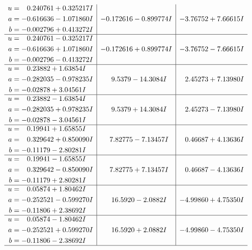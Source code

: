 \documentclass[1p]{elsarticle_modified}
\theoremstyle{definition}
\begin{document}
$$\begin{array}{c|c|c}
\begin{aligned}
u &= \phantom{-}0.240761 + 0.325217 I \\
a &= -0.616636 - 1.071860 I \\
b &= -0.002796 + 0.413272 I\end{aligned}
 & -0.172616 - 0.899774 I & -3.76752 + 7.66615 I \\ \hline\begin{aligned}
u &= \phantom{-}0.240761 - 0.325217 I \\
a &= -0.616636 + 1.071860 I \\
b &= -0.002796 - 0.413272 I\end{aligned}
 & -0.172616 + 0.899774 I & -3.76752 - 7.66615 I \\ \hline\begin{aligned}
u &= \phantom{-}0.23882 + 1.63854 I \\
a &= -0.282035 - 0.978235 I \\
b &= -0.02878 + 3.04561 I\end{aligned}
 & \phantom{-}9.5379 - 14.3084 I & \phantom{-}2.45273 + 7.13980 I \\ \hline\begin{aligned}
u &= \phantom{-}0.23882 - 1.63854 I \\
a &= -0.282035 + 0.978235 I \\
b &= -0.02878 - 3.04561 I\end{aligned}
 & \phantom{-}9.5379 + 14.3084 I & \phantom{-}2.45273 - 7.13980 I \\ \hline\begin{aligned}
u &= \phantom{-}0.19941 + 1.65855 I \\
a &= \phantom{-}0.329642 + 0.850090 I \\
b &= -0.11179 - 2.80281 I\end{aligned}
 & \phantom{-}7.82775 - 7.13457 I & \phantom{-}0.46687 + 4.13636 I \\ \hline\begin{aligned}
u &= \phantom{-}0.19941 - 1.65855 I \\
a &= \phantom{-}0.329642 - 0.850090 I \\
b &= -0.11179 + 2.80281 I\end{aligned}
 & \phantom{-}7.82775 + 7.13457 I & \phantom{-}0.46687 - 4.13636 I \\ \hline\begin{aligned}
u &= \phantom{-}0.05874 + 1.80462 I \\
a &= -0.252521 - 0.599270 I \\
b &= -0.11806 + 2.38692 I\end{aligned}
 & \phantom{-}16.5920 - 2.0882 I & -4.99860 + 4.75350 I \\ \hline\begin{aligned}
u &= \phantom{-}0.05874 - 1.80462 I \\
a &= -0.252521 + 0.599270 I \\
b &= -0.11806 - 2.38692 I\end{aligned}
 & \phantom{-}16.5920 + 2.0882 I & -4.99860 - 4.75350 I\\
 \hline 
 \end{array}$$\newpage\newpage\renewcommand{\arraystretch}{1}
\end{document}
